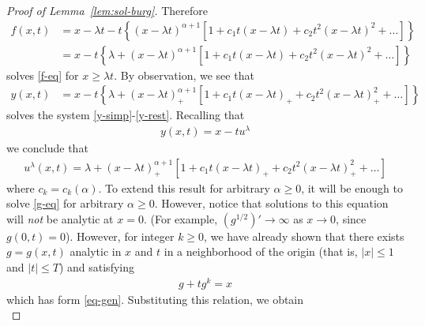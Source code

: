 \documentclass[12pt,reqno]{amsart}
\numberwithin{equation}{section}  %
\numberwithin{figure}{section}
\begin{document}
\begin{proof}[Proof of Lemma~\ref{lem:sol-burg}]
Therefore
%
%
\begin{equation*}
\begin{split}
f(x,t) 
& = x - \lambda t - t \left \{ (x - \lambda t)^{\alpha + 1}[1 + c_{1}t(x - \lambda t) + c_{2}t^{2}(x - \lambda t)^{2} + \ldots] \right \}
\\
& = x - t \left \{ \lambda  + (x - \lambda t)^{\alpha + 1} [1 + c_{1}t(x - \lambda t) + c_{2}t^{2}(x - \lambda t)^{2} + \ldots] \right \}
\end{split}
\end{equation*}
%
solves \eqref{f-eq} for $x \ge \lambda t$. By observation, we see that
%
%
\begin{equation*}
\begin{split}
y(x,t) 
& = x - t \left \{ \lambda  + (x - \lambda
    t)_{+}^{\alpha + 1} [1 + c_{1}t(x - \lambda t)_{+} +
    c_{2}t^{2}(x - \lambda t)_{+}^{2} + \ldots] \right \}
\end{split}
\end{equation*}
%
%
solves the system \eqref{y-simp}-\eqref{y-rest}.
%
%
%
Recalling that
%
%
\begin{equation*}
\begin{split}
y(x,t) = x - tu^{\lambda}
\end{split}
\end{equation*}
%
%
we conclude that
%
%
%
%
\begin{equation}
    \label{ode-sol}
\begin{split}
u^{\lambda}(x,t) = \lambda + (x - \lambda
t)_{+}^{\alpha + 1}[1 + c_{1}t(x - \lambda t)_{+} +
c_{2}t^{2}(x - \lambda t)_{+}^{2} + \ldots]
\end{split}
\end{equation}
where $c_{k} = c_{k}(\alpha)$. 
%
To extend this result for arbitrary $\alpha \ge 0$, it will be enough to solve \eqref{g-eq} for arbitrary $\alpha \ge 0$.
%
%
%
%
However, notice that solutions to this equation will \emph{not} be analytic at $x = 0$. (For example, $(g^{1/2})' \to \infty$ as $x \to 0$, since $g(0, t) = 0$). However, for integer $k \ge 0$, we have already shown that there exists $g = g(x,t)$ analytic in $x$ and $t$ in a neighborhood of the origin (that is, $|x| \le 1$ and $|t| \le T$) and satisfying
%
%
\begin{equation}
  \label{yit}
\begin{split}
  g + tg^{k} = x
\end{split}
\end{equation}
%
which has form \eqref{eq-gen}. Substituting this relation, we obtain
\begin{equation}

\end{equation}
\end{proof}
\end{document}
